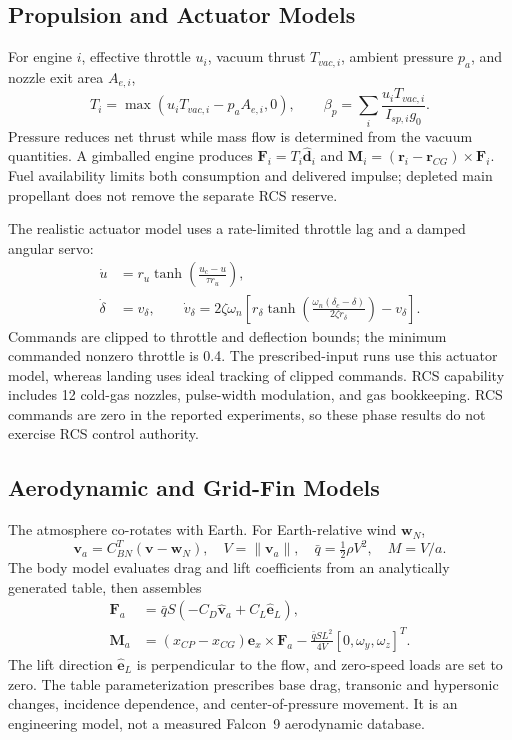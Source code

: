 \documentclass[11pt,letterpaper]{article}
\begin{document}
\subsection{Propulsion and Actuator Models}
For engine $i$, effective throttle $u_i$, vacuum thrust $T_{vac,i}$, ambient pressure $p_a$, and nozzle exit area $A_{e,i}$,
\begin{equation}
T_i=\max(u_iT_{vac,i}-p_aA_{e,i},0),\qquad
\beta_p=\sum_i\frac{u_iT_{vac,i}}{I_{sp,i}g_0}.
\end{equation}
Pressure reduces net thrust while mass flow is determined from the vacuum quantities. A gimballed engine produces $\bm F_i=T_i\hat{\bm d}_i$ and $\bm M_i=(\bm r_i-\bm r_{CG})\times\bm F_i$. Fuel availability limits both consumption and delivered impulse; depleted main propellant does not remove the separate RCS reserve.

The realistic actuator model uses a rate-limited throttle lag and a damped angular servo:
\begin{align}
\dot u&=r_u\tanh\!\left(\frac{u_c-u}{\tau r_u}\right),\\
\dot\delta&=v_\delta,\qquad
\dot v_\delta=2\zeta\omega_n\left[r_\delta\tanh\!\left(
\frac{\omega_n(\delta_c-\delta)}{2\zeta r_\delta}\right)-v_\delta\right].
\end{align}
Commands are clipped to throttle and deflection bounds; the minimum commanded nonzero throttle is 0.4. The prescribed-input runs use this actuator model, whereas landing uses ideal tracking of clipped commands. RCS capability includes 12 cold-gas nozzles, pulse-width modulation, and gas bookkeeping. RCS commands are zero in the reported experiments, so these phase results do not exercise RCS control authority.

\subsection{Aerodynamic and Grid-Fin Models}
The atmosphere co-rotates with Earth. For Earth-relative wind $\bm w_N$,
\begin{equation}
\bm v_a=C_{BN}^{T}(\bm v-\bm w_N),\quad V=\|\bm v_a\|,\quad
\bar q=\tfrac12\rho V^2,\quad M=V/a.
\end{equation}
The body model evaluates drag and lift coefficients from an analytically generated table, then assembles
\begin{align}
\bm F_a&=\bar qS(-C_D\hat{\bm v}_a+C_L\hat{\bm e}_L),\\
\bm M_a&=(x_{CP}-x_{CG})\bm e_x\times\bm F_a
-\frac{\bar qSL^2}{4V}[0,\omega_y,\omega_z]^T.
\end{align}
The lift direction $\hat{\bm e}_L$ is perpendicular to the flow, and zero-speed loads are set to zero. The table parameterization prescribes base drag, transonic and hypersonic changes, incidence dependence, and center-of-pressure movement. It is an engineering model, not a measured Falcon~9 aerodynamic database.
\end{document}
